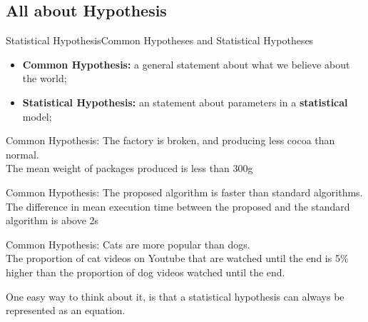\subsection{All about Hypothesis}
\begin{frame}{Statistical Hypothesis}{Common Hypotheses and Statistical Hypotheses}
  \begin{itemize}
    \item {\bf Common Hypothesis:} a general statement about what we believe about the world;
    \item {\bf Statistical Hypothesis:} an statement about parameters in a {\bf statistical} model;
  \end{itemize}\bigskip

  {\smaller
  \alert{Common Hypothesis:} The factory is broken, and producing less cocoa than normal.\\
   The mean weight of packages produced is less than 300g\\
  \medskip

  \alert{Common Hypothesis:} The proposed algorithm is faster than standard algorithms.\\
   The difference in mean execution time between the proposed and the standard algorithm is above 2s\\
  \medskip

  \alert{Common Hypothesis:} Cats are more popular than dogs.\\
   The proportion of cat videos on Youtube that are watched until the end is 5\% higher than the proportion of dog videos watched until the end.
  }

  \vfill

  One easy way to think about it, is that a statistical hypothesis can always be represented as an equation.
\end{frame}

